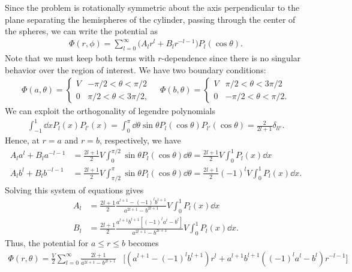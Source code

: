 {Since the problem is rotationally symmetric about the axis perpendicular to the plane separating the hemispheres of the cylinder, passing through the center of the spheres, we can write the potential as
\begin{align}
    \Phi(r,\phi) = \sum_{l=0}^{\infty} \Big( A_{l} r^{l} + B_{l} r^{-l-1} \Big) P_{l}(\cos{\theta})
.\end{align}
Note that we must keep both terms with $r$-dependence since there is no singular behavior over the region of interest.
We have two boundary conditions: 
\begin{align}
    \Phi(a,\theta) = \begin{cases}
        V & -\pi/2 < \theta < \pi/2 \\
        0 & \pi/2 < \theta < 3 \pi / 2
    ,\end{cases}
    \quad
    \Phi(b,\theta) = \begin{cases}
        V & \pi/2 < \theta < 3 \pi / 2 \\
        0 & -\pi/2 < \theta < \pi/2
    .\end{cases}
\end{align}
We can exploit the orthogonality of legendre polynomials
\begin{align}
    \int_{-1}^{1} \dd{x} P_{l}(x) P_{l'}(x) = \int_{0}^{\pi} \dd{\theta} \sin{\theta} P_{l}(\cos{\theta}) P_{l'}(\cos{\theta}) = \frac{2}{2l+1} \delta_{ll'}
.\end{align}
Hence, at $r = a$ and $r = b$, respectively, we have
\begin{align}
    A_{l} a^{l} + B_{l} a^{-l-1} &= \frac{2l+1}{2} V \int_{0}^{\pi/2} \sin{\theta} P_{l}(\cos{\theta}) \dd{\theta} = \frac{2l+1}{2} V \int_{0}^{1} P_{l}(x) \dd{x} \\
    A_{l} b^{l} + B_{l} b^{-l-1} &= \frac{2l+1}{2} V \int_{\pi/2}^{\pi} \sin{\theta} P_{l}(\cos{\theta}) \dd{\theta} = \frac{2l+1}{2} (-1)^{l} V \int_{0}^{1} P_{l}(x) \dd{x}
.\end{align}
Solving this system of equations gives
\begin{align}
    A_{l} &= \frac{2l+1}{2} \frac{a^{l+1}-(-1)^{l} b^{l+1}}{a^{2l+1}-b^{2l+1}} V \int_{0}^{1} P_{l}(x) \dd{x} \\
    B_{l} &= \frac{2l+1}{2} \frac{a^{l+1}b^{l+1} [(-1)^{l}a^{l}-b^{l}]}{a^{2l+1}-b^{2l+1}} V \int_{0}^{1} P_{l}(x) \dd{x}
.\end{align}
Thus, the potential for $a \leq r \leq b$ becomes
\begin{align}
    \Phi(r,\theta) = \frac{V}{2} \sum_{l=0}^{\infty} \frac{2l+1}{a^{2l+1} - b^{2l+1}} &\Big[ (a^{l+1} - (-1)^{l} b^{l+1}) r^{l} + a^{l+1}b^{l+1}((-1)^{l}a^{l} - b^{l}) r^{-l-1} \Big] \nonumber \\

\end{align}}
